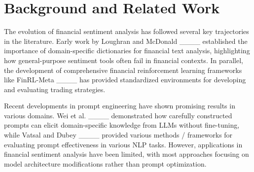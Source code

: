 \section{Background and Related Work}
The evolution of financial sentiment analysis has followed several key trajectories in the literature. Early work by Loughran and McDonald ____ established the importance of domain-specific dictionaries for financial text analysis, highlighting how general-purpose sentiment tools often fail in financial contexts. In parallel, the development of comprehensive financial reinforcement learning frameworks like FinRL-Meta ____ has provided standardized environments for developing and evaluating trading strategies.

Recent developments in prompt engineering have shown promising results in various domains. Wei et al. ____ demonstrated how carefully constructed prompts can elicit domain-specific knowledge from LLMs without fine-tuning, while Vatsal and Dubey ____ provided various methods / frameworks for evaluating prompt effectiveness in various NLP tasks. However, applications in financial sentiment analysis have been limited, with most approaches focusing on model architecture modifications rather than prompt optimization.
